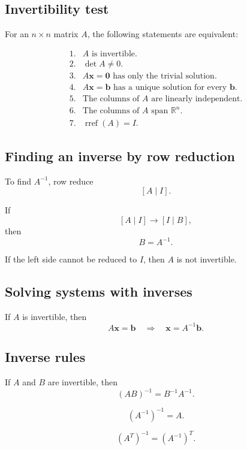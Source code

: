 \subsection*{Invertibility test}

For an \(n\times n\) matrix \(A\), the following statements are equivalent:

\[
\begin{array}{ll}
1. & A\text{ is invertible.}\\[1mm]
2. & \det A\ne0.\\[1mm]
3. & A\mathbf x=\mathbf 0\text{ has only the trivial solution.}\\[1mm]
4. & A\mathbf x=\mathbf b\text{ has a unique solution for every }\mathbf b.\\[1mm]
5. & \text{The columns of }A\text{ are linearly independent.}\\[1mm]
6. & \text{The columns of }A\text{ span }\mathbb R^n.\\[1mm]
7. & \operatorname{rref}(A)=I.
\end{array}
\]

\subsection*{Finding an inverse by row reduction}

To find \(A^{-1}\), row reduce
\[
\boxed{
    [A\mid I].
}
\]

If
\[
    [A\mid I]
    \longrightarrow
    [I\mid B],
\]
then
\[
\boxed{
    B=A^{-1}.
}
\]

If the left side cannot be reduced to \(I\), then \(A\) is not invertible.

\subsection*{Solving systems with inverses}

If \(A\) is invertible, then
\[
\boxed{
    A\mathbf x=\mathbf b
    \quad\Longrightarrow\quad
    \mathbf x=A^{-1}\mathbf b.
}
\]

\subsection*{Inverse rules}

If \(A\) and \(B\) are invertible, then
\[
\boxed{
    (AB)^{-1}=B^{-1}A^{-1}.
}
\]

\[
\boxed{
    (A^{-1})^{-1}=A.
}
\]

\[
\boxed{
    (A^T)^{-1}=(A^{-1})^T.
}
\]

